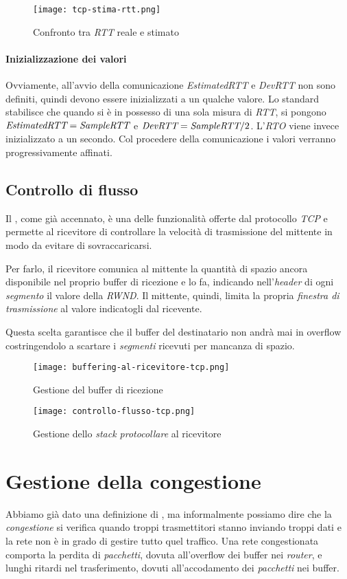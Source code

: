 \begin{figure}[ht]
    \centering
    \texttt{[image: tcp-stima-rtt.png]}
    \caption{Confronto tra \emph{RTT} reale e stimato}
\end{figure}

\paragraph{Inizializzazione dei valori}
Ovviamente, all'avvio della comunicazione \emph{EstimatedRTT} e \emph{DevRTT}
non sono definiti, quindi devono essere inizializzati a un qualche valore. Lo
standard stabilisce che quando si è in possesso di una sola misura di \emph{RTT},
si pongono $\emph{EstimatedRTT}=\emph{SampleRTT}$ e $\emph{DevRTT}=\emph{SampleRTT}/2$.
L'\emph{RTO} viene invece inizializzato a un secondo. Col procedere della
comunicazione i valori verranno progressivamente affinati.

\subsection{Controllo di flusso}
Il \emph{}, come già accennato, è una delle funzionalità
offerte dal protocollo \emph{TCP} e permette al ricevitore di controllare la
velocità di trasmissione del mittente in modo da evitare di sovraccaricarsi.

Per farlo, il ricevitore comunica al mittente la quantità di spazio ancora
disponibile nel proprio buffer di ricezione e lo fa, indicando nell'\emph{header}
di ogni \emph{segmento} il valore della \emph{RWND}. Il mittente, quindi, limita
la propria \emph{finestra di trasmissione} al valore indicatogli dal ricevente.

Questa scelta garantisce che il buffer del destinatario non andrà mai in
overflow costringendolo a scartare i \emph{segmenti} ricevuti per mancanza di
spazio.

\begin{figure}[h!]
    \centering
    \texttt{[image: buffering-al-ricevitore-tcp.png]}
    \caption{Gestione del buffer di ricezione}
\end{figure}
\newpage
\begin{figure}[ht!]
    \centering
    \texttt{[image: controllo-flusso-tcp.png]}
    \caption{Gestione dello \emph{stack protocollare} al ricevitore}
\end{figure}

\section{Gestione della congestione}
Abbiamo già dato una definizione di , ma informalmente possiamo
dire che la \emph{congestione} si verifica quando troppi trasmettitori stanno
inviando troppi dati e la rete non è in grado di gestire tutto quel traffico.
Una rete congestionata comporta la perdita di \emph{pacchetti}, dovuta
all'overflow dei buffer nei \emph{router}, e lunghi ritardi nel trasferimento,
dovuti all'accodamento dei \emph{pacchetti} nei buffer.

